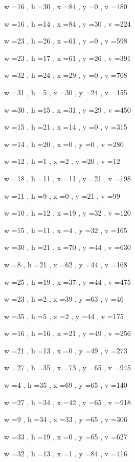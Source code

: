 \documentclass[11pt]{article}
\begin{document}
w =16 , h =30 , x =84 , y =0 , v =480
\par
w =16 , h =14 , x =84 , y =30 , v =224
\par
w =23 , h =26 , x =61 , y =0 , v =598
\par
w =23 , h =17 , x =61 , y =26 , v =391
\par
w =32 , h =24 , x =29 , y =0 , v =768
\par
w =31 , h =5 , x =30 , y =24 , v =155
\par
w =30 , h =15 , x =31 , y =29 , v =450
\par
w =15 , h =21 , x =14 , y =0 , v =315
\par
w =14 , h =20 , x =0 , y =0 , v =280
\par
w =12 , h =1 , x =2 , y =20 , v =12
\par
w =18 , h =11 , x =11 , y =21 , v =198
\par
w =11 , h =9 , x =0 , y =21 , v =99
\par
w =10 , h =12 , x =19 , y =32 , v =120
\par
w =15 , h =11 , x =4 , y =32 , v =165
\par
w =30 , h =21 , x =70 , y =44 , v =630
\par
w =8 , h =21 , x =62 , y =44 , v =168
\par
w =25 , h =19 , x =37 , y =44 , v =475
\par
w =23 , h =2 , x =39 , y =63 , v =46
\par
w =35 , h =5 , x =2 , y =44 , v =175
\par
w =16 , h =16 , x =21 , y =49 , v =256
\par
w =21 , h =13 , x =0 , y =49 , v =273
\par
w =27 , h =35 , x =73 , y =65 , v =945
\par
w =4 , h =35 , x =69 , y =65 , v =140
\par
w =27 , h =34 , x =42 , y =65 , v =918
\par
w =9 , h =34 , x =33 , y =65 , v =306
\par
w =33 , h =19 , x =0 , y =65 , v =627
\par
w =32 , h =13 , x =1 , y =84 , v =416
\par
\newpage
\end{document}
